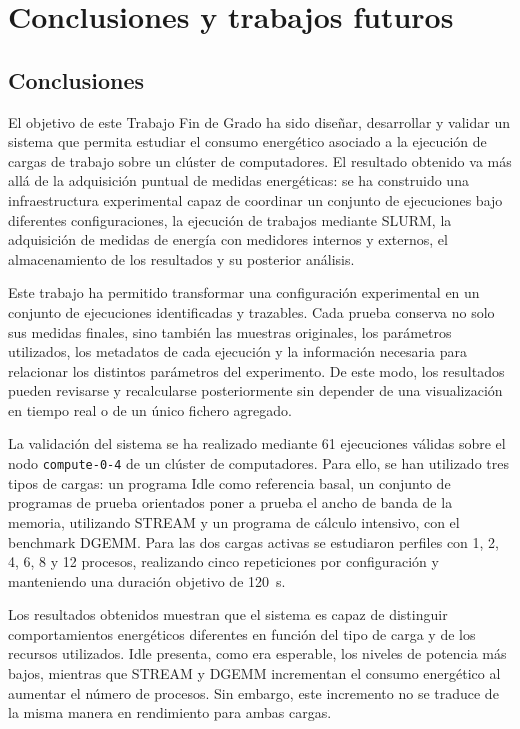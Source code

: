 \chapter{Conclusiones y trabajos futuros}
\label{chap:conclusiones}

\section{Conclusiones}
\label{sec:conclusiones}

El objetivo de este Trabajo Fin de Grado ha sido diseñar, desarrollar y validar un sistema que permita estudiar el consumo energético asociado a la ejecución de cargas de trabajo sobre un clúster de computadores. El resultado obtenido va más allá de la adquisición puntual de medidas energéticas: se ha construido una infraestructura experimental capaz de coordinar un conjunto de ejecuciones bajo diferentes configuraciones, la ejecución de trabajos mediante SLURM, la adquisición de medidas de energía con medidores internos y externos, el almacenamiento de los resultados y su posterior análisis.

Este trabajo ha permitido transformar una configuración experimental en un conjunto de ejecuciones identificadas y trazables. Cada prueba conserva no solo sus medidas finales, sino también las muestras originales, los parámetros utilizados, los metadatos de cada ejecución y la información necesaria para relacionar los distintos parámetros del experimento. De este modo, los resultados pueden revisarse y recalcularse posteriormente sin depender de una visualización en tiempo real o de un único fichero agregado.

La validación del sistema se ha realizado mediante 61 ejecuciones válidas sobre el nodo \texttt{compute-0-4} de un clúster de computadores. Para ello, se han utilizado tres tipos de cargas: un programa Idle como referencia basal, un conjunto de programas de prueba orientados poner a prueba el ancho de banda de la memoria, utilizando STREAM y un programa de cálculo intensivo, con el benchmark DGEMM. Para las dos cargas activas se estudiaron perfiles con 1, 2, 4, 6, 8 y 12 procesos, realizando cinco repeticiones por configuración y manteniendo una duración objetivo de 120~s.

Los resultados obtenidos muestran que el sistema es capaz de distinguir comportamientos energéticos diferentes en función del tipo de carga y de los recursos utilizados. Idle presenta, como era esperable, los niveles de potencia más bajos, mientras que STREAM y DGEMM incrementan el consumo energético al aumentar el número de procesos. Sin embargo, este incremento no se traduce de la misma manera en rendimiento para ambas cargas.

